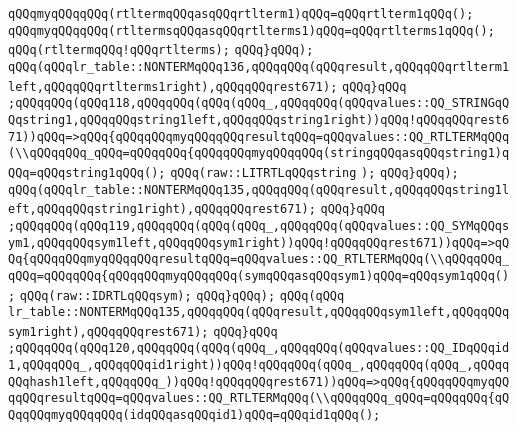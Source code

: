 \verb|qQQqmyqQQqqQQq(rtltermqQQqasqQQqrtlterm1)qQQq=qQQqrtlterm1qQQq();|\newline
\verb|qQQqmyqQQqqQQq(rtltermsqQQqasqQQqrtlterms1)qQQq=qQQqrtlterms1qQQq();|\newline
\verb|qQQq(rtltermqQQq!qQQqrtlterms);|\newline
\verb|qQQq}qQQq);|\newline
\verb|qQQq(qQQqlr_table::NONTERMqQQq136,qQQqqQQq(qQQqresult,qQQqqQQqrtlterm1left,qQQqqQQqrtlterms1right),qQQqqQQqrest671);|\newline
\verb|qQQq}qQQq|\newline
\verb|;qQQqqQQq(qQQq118,qQQqqQQq(qQQq(qQQq_,qQQqqQQq(qQQqvalues::QQ_STRINGqQQqstring1,qQQqqQQqstring1left,qQQqqQQqstring1right))qQQq!qQQqqQQqrest671))qQQq=>qQQq{qQQqqQQqmyqQQqqQQqresultqQQq=qQQqvalues::QQ_RTLTERMqQQq(\\qQQqqQQq_qQQq=qQQqqQQq{qQQqqQQqmyqQQqqQQq(stringqQQqasqQQqstring1)qQQq=qQQqstring1qQQq();|\newline
\verb|qQQq(raw::LITRTLqQQqstring|\newline
\verb|);|\newline
\verb|qQQq}qQQq);|\newline
\verb|qQQq(qQQqlr_table::NONTERMqQQq135,qQQqqQQq(qQQqresult,qQQqqQQqstring1left,qQQqqQQqstring1right),qQQqqQQqrest671);|\newline
\verb|qQQq}qQQq|\newline
\verb|;qQQqqQQq(qQQq119,qQQqqQQq(qQQq(qQQq_,qQQqqQQq(qQQqvalues::QQ_SYMqQQqsym1,qQQqqQQqsym1left,qQQqqQQqsym1right))qQQq!qQQqqQQqrest671))qQQq=>qQQq{qQQqqQQqmyqQQqqQQqresultqQQq=qQQqvalues::QQ_RTLTERMqQQq(\\qQQqqQQq_qQQq=qQQqqQQq{qQQqqQQqmyqQQqqQQq(symqQQqasqQQqsym1)qQQq=qQQqsym1qQQq();|\newline
\verb|qQQq(raw::IDRTLqQQqsym);|\newline
\verb|qQQq}qQQq);|\newline
\verb|qQQq(qQQq|\newline
\verb|lr_table::NONTERMqQQq135,qQQqqQQq(qQQqresult,qQQqqQQqsym1left,qQQqqQQqsym1right),qQQqqQQqrest671);|\newline
\verb|qQQq}qQQq|\newline
\verb|;qQQqqQQq(qQQq120,qQQqqQQq(qQQq(qQQq_,qQQqqQQq(qQQqvalues::QQ_IDqQQqid1,qQQqqQQq_,qQQqqQQqid1right))qQQq!qQQqqQQq(qQQq_,qQQqqQQq(qQQq_,qQQqqQQqhash1left,qQQqqQQq_))qQQq!qQQqqQQqrest671))qQQq=>qQQq{qQQqqQQqmyqQQqqQQqresultqQQq=qQQqvalues::QQ_RTLTERMqQQq(\\qQQqqQQq_qQQq=qQQqqQQq{qQQqqQQqmyqQQqqQQq(idqQQqasqQQqid1)qQQq=qQQqid1qQQq();|\newline
